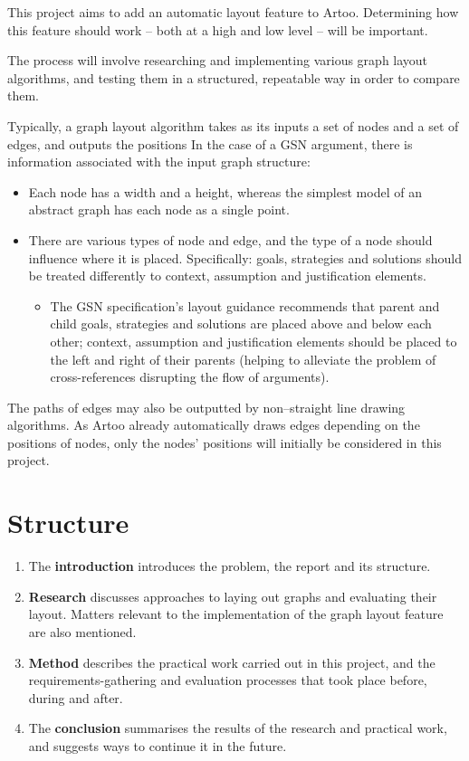 This project aims to add an automatic layout feature to Artoo.
Determining how this feature should work -- both at a high and low level -- will be important.

The process will involve researching and implementing various graph layout algorithms,
and testing them in a structured, repeatable way in order to compare them. 

Typically, a graph layout algorithm takes as its inputs a set of nodes and a set of edges, and outputs the positions 
In the case of a GSN argument, there is information associated with the input graph structure:

\begin{itemize}
  \item
    Each node has a width and a height, whereas the simplest model of an abstract graph has each node as a single point.
  \item
    There are various types of node and edge, and the type of a node should influence where it is placed. Specifically: goals, strategies and solutions should be treated differently to context, assumption and justification elements.
    \begin{itemize}
    \item The GSN specification's layout guidance \citep[section~2.2, pp.~26--27]{gsnstandard} recommends that parent and child goals, strategies and solutions are placed above and below each other; context, assumption and justification elements should be placed to the left and right of their parents (helping to alleviate the problem of cross-references disrupting the flow of arguments).
    \end{itemize}
\end{itemize}

The paths of edges may also be outputted by non--straight line drawing algorithms. As Artoo already automatically draws edges depending on the positions of nodes, only the nodes' positions will initially be considered in this project.


\section{Structure}

\begin{enumerate}
\item The \textbf{introduction} introduces the problem, the report and its structure.
\item \textbf{Research} discusses approaches to laying out graphs and evaluating their layout. Matters relevant to the implementation of the graph layout feature are also mentioned.
\item \textbf{Method} describes the practical work carried out in this project, and the requirements-gathering and evaluation processes that took place before, during and after.
\item The \textbf{conclusion} summarises the results of the research and practical work, and suggests ways to continue it in the future.
\end{enumerate}


